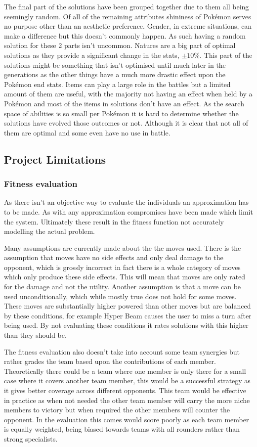 \documentclass[a4paper]{article}
\newcommand{\Pokemon}{Pok\'{e}mon}
\begin{document}
\par
The final part of the solutions have been grouped together due to them all being seemingly random.
Of all of the remaining attributes shininess of \Pokemon{} serves no purpose other than an aesthetic preference.
Gender, in extreme situations, can make a difference but this doesn't commonly happen.
As such having a random solution for these 2 parts isn't uncommon.
Natures are a big part of optimal solutions as they provide a significant change in the stats, $\pm 10\%$.
This part of the solutions might be something that isn't optimised until much later in the generations as the other things have a much more drastic effect upon the \Pokemon{} end stats.
Items can play a large role in the battles but a limited amount of them are useful, with the majority not having an effect when held by a \Pokemon{} and most of the items in solutions don't have an effect.
As the search space of abilities is so small per \Pokemon{} it is hard to determine whether the solutions have evolved those outcomes or not.
Although it is clear that not all of them are optimal and some even have no use in battle.
\subsection{Project Limitations}
\subsubsection{Fitness evaluation}
\par
As there isn't an objective way to evaluate the individuals an approximation has to be made.
As with any approximation compromises have been made which limit the system.
Ultimately these result in the fitness function not accurately modelling the actual problem.
\par
Many assumptions are currently made about the the moves used.
There is the assumption that moves have no side effects and only deal damage to the opponent, which is grossly incorrect in fact there is a whole category of moves which only produce these side effects.
This will mean that moves are only rated for the damage and not the utility.
Another assumption is that a move can be used unconditionally, which while mostly true does not hold for some moves.
These moves are substantially higher powered than other moves but are balanced by these conditions, for example Hyper Beam causes the user to miss a turn after being used.
By not evaluating these conditions it rates solutions with this higher than they should be.
\par
The fitness evaluation also doesn't take into account some team synergies but rather grades the team based upon the contributions of each member.
Theoretically there could be a team where one member is only there for a small case where it covers another team member, this would be a successful strategy as it gives better coverage across different opponents.
This team would be effective in practice as when not needed the other team member will carry the more niche members to victory but when required the other members will counter the opponent.
In the evaluation this comes would score poorly as each team member is equally weighted, being biased towards teams with all rounders rather than strong specialists.
\end{document}
